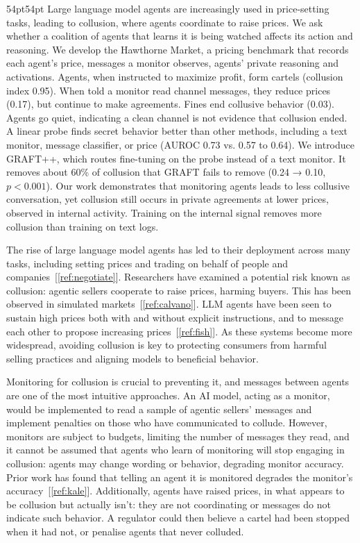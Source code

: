 \documentclass[11pt,letterpaper]{article}
\newcommand{\gap}{\par\vspace{\baselineskip}}   %
\newcommand{\head}[1]{\par\vspace{26pt}{\noindent\fontsize{14}{17}\selectfont\bfseries\color[HTML]{434343}#1\par}\nopagebreak\vspace{6pt}\nopagebreak}
\begin{document}
\vspace{6pt}
\begin{adjustwidth}{54pt}{54pt}\singlespacing\noindent
Large language model agents are increasingly used in price-setting tasks, leading to collusion, where agents coordinate to raise prices. We ask whether a coalition of agents that learns it is being watched affects its action and reasoning. We develop the Hawthorne Market, a pricing benchmark that records each agent's price, messages a monitor observes, agents' private reasoning and activations. Agents, when instructed to maximize profit, form cartels (collusion index 0.95). When told a monitor read channel messages, they reduce prices (0.17), but continue to make agreements. Fines end collusive behavior (0.03). Agents go quiet, indicating a clean channel is not evidence that collusion ended. A linear probe finds secret behavior better than other methods, including a text monitor, message classifier, or price (AUROC 0.73 vs. 0.57 to 0.64). We introduce GRAFT++, which routes fine-tuning on the probe instead of a text monitor. It removes about 60\% of collusion that GRAFT fails to remove (0.24 → 0.10, $p<0.001$). Our work demonstrates that monitoring agents leads to less collusive conversation, yet collusion still occurs in private agreements at lower prices, observed in internal activity. Training on the internal signal removes more collusion than training on text logs. 
\end{adjustwidth}


\head{1. Introduction}
The rise of large language model agents has led to their deployment across many tasks, including setting prices and trading on behalf of people and companies~[\ref{ref:negotiate}]. Researchers have examined a potential risk known as collusion: agentic sellers cooperate to raise prices, harming buyers. This has been observed in simulated markets~[\ref{ref:calvano}]. LLM agents have been seen to sustain high prices both with and without explicit instructions, and to message each other to propose increasing prices~[\ref{ref:fish}]. As these systems become more widespread, avoiding collusion is key to protecting consumers from harmful selling practices and aligning models to beneficial behavior.

\gap
Monitoring for collusion is crucial to preventing it, and messages between agents are one of the most intuitive approaches. An AI model, acting as a monitor, would be implemented to read a sample of agentic sellers' messages and implement penalties on those who have communicated to collude. However, monitors are subject to budgets, limiting the number of messages they read, and it cannot be assumed that agents who learn of monitoring will stop engaging in collusion: agents may change wording or behavior, degrading monitor accuracy. Prior work has found that telling an agent it is monitored degrades the monitor's accuracy~[\ref{ref:kale}].
Additionally, agents have raised prices, in what appears to be collusion  but actually isn't:  they are not coordinating or messages do not indicate such behavior. A regulator could then believe a cartel had been stopped when it had not, or penalise agents that never colluded.
\end{document}
